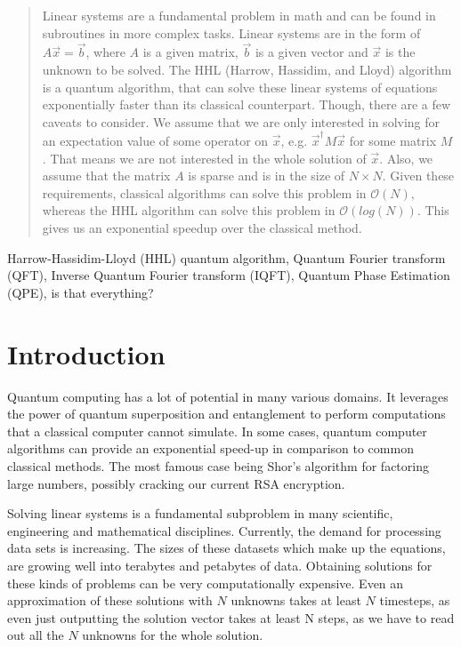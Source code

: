 


\begin{abstract}
Linear systems are a fundamental problem in math and can be found in subroutines in more complex tasks.
Linear systems are in the form of $A \vec x = \vec b$, where $A$ is a given matrix, $\vec b$ is a given vector and $\vec x$ is the unknown to be solved.
The HHL (Harrow, Hassidim, and Lloyd) algorithm is a quantum algorithm, that can solve these linear systems of equations exponentially faster than its classical counterpart. 
Though, there are a few caveats to consider.
We assume that we are only interested in solving for an expectation value of some operator on $\vec x$, e.g. $\vec{x}^\dagger M \vec x$ for some matrix $M$.
That means we are not interested in the whole solution of $\vec x$.
Also, we assume that the matrix $A$ is sparse and is in the size of $N\times N$. 
Given these requirements, classical algorithms can solve this problem in $\mathcal{O}(N )$, whereas the HHL algorithm can solve this problem in $\mathcal{O}(log (N) )$.
This gives us an exponential speedup over the classical method.
\end{abstract}

\begin{IEEEkeywords}
Harrow-Hassidim-Lloyd (HHL) quantum algorithm, 
Quantum Fourier transform (QFT), 
Inverse Quantum Fourier transform (IQFT), 
Quantum Phase Estimation (QPE),
is that everything?
\end{IEEEkeywords}



\section{Introduction}


Quantum computing has a lot of potential in many various domains. 
It leverages the power of quantum superposition and entanglement to perform computations that a classical computer cannot simulate.
In some cases, quantum computer algorithms can provide an exponential speed-up in comparison to common classical methods.
The most famous case being Shor's algorithm for factoring large numbers, possibly cracking our current RSA encryption.

Solving linear systems is a fundamental subproblem in many scientific, engineering and mathematical disciplines. 
Currently, the demand for processing data sets is increasing. 
The sizes of these datasets which make up the equations, are growing well into terabytes and petabytes of data.
Obtaining solutions for these kinds of problems can be very computationally expensive.
Even an approximation of these solutions with $N$ unknowns takes at least $N$ timesteps, as even just outputting the solution vector takes at least N steps, as we have to read out all the $N$ unknowns for the whole solution.

